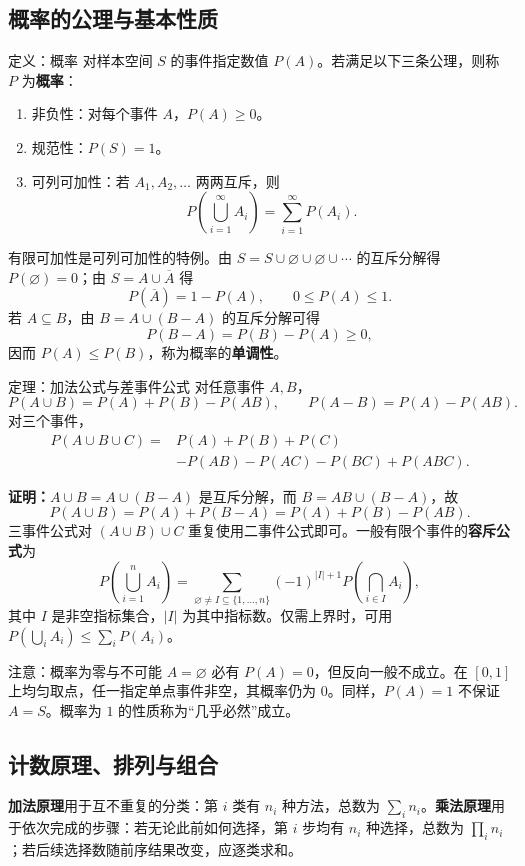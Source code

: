 \documentclass[UTF8,fontset=none,zihao=-4,a4paper]{ctexart}
\newcommand{\term}[1]{\textbf{#1}}
\newcommand{\proof}{\par\noindent\textbf{证明：}}
\begin{document}
\subsection{概率的公理与基本性质}
\begin{infobox}{定义：概率}
对样本空间 $S$ 的事件指定数值 $P(A)$。若满足以下三条公理，则称 $P$ 为\term{概率}：
\begin{enumerate}
\item 非负性：对每个事件 $A$，$P(A)\ge0$。
\item 规范性：$P(S)=1$。
\item 可列可加性：若 $A_1,A_2,\ldots$ 两两互斥，则
\[
P\left(\bigcup_{i=1}^{\infty}A_i\right)=\sum_{i=1}^{\infty}P(A_i).
\]
\end{enumerate}
\end{infobox}
有限可加性是可列可加性的特例。由 $S=S\cup\varnothing\cup\varnothing\cup\cdots$ 的互斥分解得 $P(\varnothing)=0$；由 $S=A\cup\overline A$ 得
\[
P(\overline A)=1-P(A),\qquad 0\le P(A)\le1.
\]
若 $A\subseteq B$，由 $B=A\cup(B-A)$ 的互斥分解可得
\[
P(B-A)=P(B)-P(A)\ge0,
\]
因而 $P(A)\le P(B)$，称为概率的\term{单调性}。
\begin{infobox}{定理：加法公式与差事件公式}
对任意事件 $A,B$，
\[
P(A\cup B)=P(A)+P(B)-P(AB),\qquad
P(A-B)=P(A)-P(AB).
\]
对三个事件，
\[
\begin{aligned}
P(A\cup B\cup C)={}&P(A)+P(B)+P(C)\\
&-P(AB)-P(AC)-P(BC)+P(ABC).
\end{aligned}
\]
\end{infobox}
\proof $A\cup B=A\cup(B-A)$ 是互斥分解，而 $B=AB\cup(B-A)$，故
\[
P(A\cup B)=P(A)+P(B-A)=P(A)+P(B)-P(AB).
\]
三事件公式对 $(A\cup B)\cup C$ 重复使用二事件公式即可。一般有限个事件的\term{容斥公式}为
\[
P\left(\bigcup_{i=1}^n A_i\right)
=\sum_{\varnothing\ne I\subseteq\{1,\ldots,n\}}
(-1)^{|I|+1}P\left(\bigcap_{i\in I}A_i\right),
\]
其中 $I$ 是非空指标集合，$|I|$ 为其中指标数。仅需上界时，可用 $P(\bigcup_i A_i)\le\sum_i P(A_i)$。
\begin{infobox}{注意：概率为零与不可能}
$A=\varnothing$ 必有 $P(A)=0$，但反向一般不成立。在 $[0,1]$ 上均匀取点，任一指定单点事件非空，其概率仍为 $0$。同样，$P(A)=1$ 不保证 $A=S$。概率为 $1$ 的性质称为“几乎必然”成立。
\end{infobox}
\subsection{计数原理、排列与组合}
\term{加法原理}用于互不重复的分类：第 $i$ 类有 $n_i$ 种方法，总数为 $\sum_i n_i$。\term{乘法原理}用于依次完成的步骤：若无论此前如何选择，第 $i$ 步均有 $n_i$ 种选择，总数为 $\prod_i n_i$；若后续选择数随前序结果改变，应逐类求和。
\end{document}

